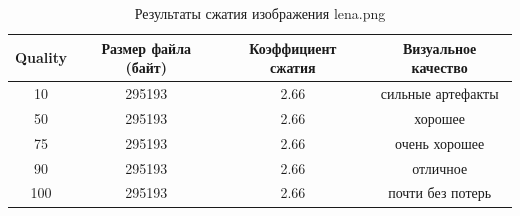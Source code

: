 \begin{table}[h]
\centering
\caption{Результаты сжатия изображения lena.png}
\begin{tabular}{|c|c|c|c|}
\hline
Quality & Размер файла (байт) & Коэффициент сжатия & Визуальное качество \\
\hline
10 & 295193 & 2.66 & сильные артефакты \\
\hline
50 & 295193 & 2.66 & хорошее \\
\hline
75 & 295193 & 2.66 & очень хорошее \\
\hline
90 & 295193 & 2.66 & отличное \\
\hline
100 & 295193 & 2.66 & почти без потерь \\
\hline
\end{tabular}
\end{table}
